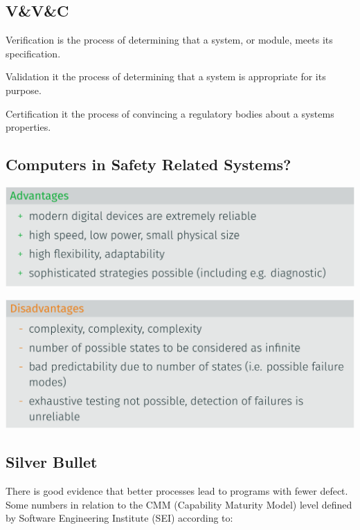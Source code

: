 \documentclass[
  10pt,
  a4paper,
  twocolumn]{article}
\providecommand{\tightlist}{%
  \setlength{\itemsep}{0pt}\setlength{\parskip}{0pt}}\usepackage{longtable,booktabs,array}
\begin{document}
\subsection{V\&V\&C}\label{vvc}

\begin{description}
\tightlist
\item[Verification]
Verification is the process of determining that a system, or module,
meets its specification.
\item[Validation]
Validation it the process of determining that a system is appropriate
for its purpose.
\item[Certification]
Certification it the process of convincing a regulatory bodies about a
systems properties.
\end{description}

\subsection{Computers in Safety Related
Systems?}\label{computers-in-safety-related-systems}

\includegraphics{images/safety/image-32.png}

\includegraphics{images/safety/image-33.png}

\subsection{Silver Bullet}\label{silver-bullet}

There is good evidence that better processes lead to programs with fewer
defect. Some numbers in relation to the CMM (Capability Maturity Model)
level defined by Software Engineering Institute (SEI) according to:
\end{document}
